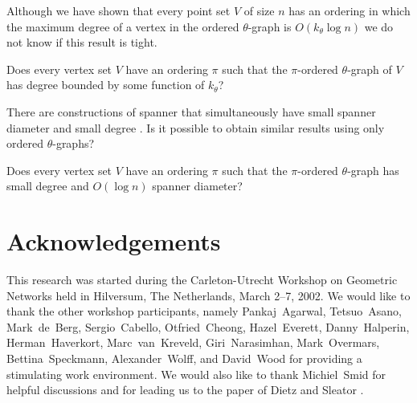 \documentclass{elsart}
\begin{document}
Although we have shown that every point set $V$ of size $n$ has an
ordering in which the maximum degree of a vertex in the ordered
$\theta$-graph is $O(k_\theta\log n)$ we do not know if this result is
tight.
\begin{op}
Does every vertex set $V$ have an ordering $\pi$ such that the
$\pi$-ordered $\theta$-graph of $V$ has degree bounded by some
function of $k_\theta$?
\end{op}

There are constructions of spanner that simultaneously have small
spanner diameter and small degree \cite{admss95}.  Is it possible to
obtain similar results using only ordered $\theta$-graphs?


\begin{op}
Does every vertex set $V$ have an ordering $\pi$ such that the
$\pi$-ordered $\theta$-graph has small degree and $O(\log n)$ spanner
diameter?
\end{op}

\section*{Acknowledgements}

This research was started during the Carleton-Utrecht Workshop on
Geometric Networks held in Hilversum, The Netherlands, March 2--7,
2002.  We would like to thank the other workshop participants, namely
Pankaj~Agarwal, Tetsuo~Asano, Mark~de~Berg, Sergio~Cabello,
Otfried~Cheong, Hazel~Everett, Danny~Halperin, Herman~Haverkort,
Marc~van~Kreveld, Giri~Narasimhan, Mark~Overmars, Bettina~Speckmann,
Alexander~Wolff, and David~Wood for providing a stimulating work
environment.  We would also like to thank Michiel~Smid for helpful
discussions and for leading us to the paper of Dietz and Sleator
\cite{ds87}.



\end{document}
